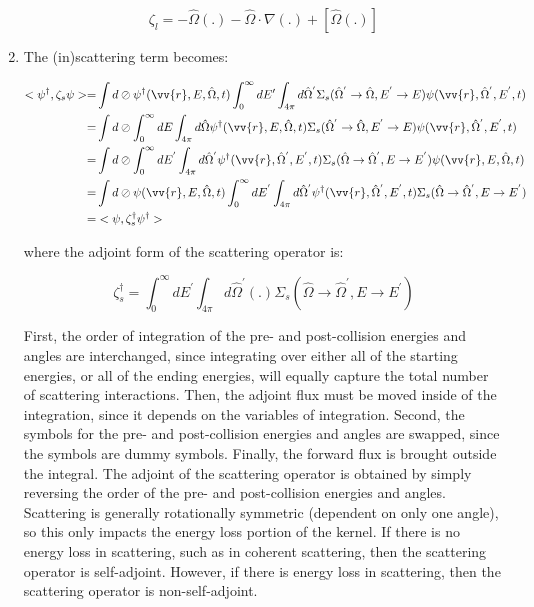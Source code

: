 \documentclass[10pt]{article}
\newcommand{\hO}{\hat{\Omega}}
\newcommand{\spa}{(\vv{r}, E, \hO, t)}
\begin{document}
\begin{flushleft}
\begin{enumerate}
\begin{equation}
\zeta_l=-\hO  (.)-\hO  \cdot\nabla(.)+\left\lbrack\hO  (.)\right\rbrack
\end{equation}

\item The (in)scattering term becomes:

\begin{equation}
\begin{aligned}
<\psi^\dagger,\zeta_s\psi>=& \int d\oslash\psi^\dagger\spa \int_0^\infty dE'\int_{4\pi}d\hO  ^{'}\Sigma_s(\hO  ^{'}\rightarrow\hO  , E^{'}\rightarrow E)\psi(\vv{r},\hO  ^{'},E^{'},t)\\
=& \int d\oslash\int_0^\infty dE\int_{4\pi}d\hO  \psi^\dagger\spa \Sigma_s(\hO  ^{'}\rightarrow\hO  , E^{'}\rightarrow E)\psi(\vv{r},\hO  ^{'},E^{'},t)\\
=& \int d\oslash\int_0^\infty dE^{'}\int_{4\pi}d\hO  ^{'}\psi^\dagger(\vv{r},\hO  ^{'},E^{'},t)\Sigma_s(\hO  \rightarrow\hO  ^{'}, E\rightarrow E^{'})\psi\spa \\
=& \int d\oslash\psi\spa \int_0^\infty dE^{'}\int_{4\pi}d\hO  ^{'}\psi^\dagger(\vv{r},\hO  ^{'},E^{'},t)\Sigma_s(\hO  \rightarrow\hO  ^{'}, E\rightarrow E^{'})\\
=& <\psi, \zeta_s^\dagger\psi^\dagger>
\end{aligned}
\end{equation}

where the adjoint form of the scattering operator is:

\begin{equation}
\zeta_s^\dagger= \int_0^\infty dE^{'}\int_{4\pi}d\hO  ^{'}(.)\Sigma_s(\hO  \rightarrow\hO  ^{'}, E\rightarrow E^{'})
\end{equation}

First, the order of integration of the pre- and post-collision energies and angles are interchanged, since integrating over either all of the starting energies, or all of the ending energies, will equally capture the total number of scattering interactions. Then, the adjoint flux must be moved inside of the integration, since it depends on the variables of integration. Second, the symbols for the pre- and post-collision energies and angles are swapped, since the symbols are dummy symbols. Finally, the forward flux is brought outside the integral. The adjoint of the scattering operator is obtained by simply reversing the order of the pre- and post-collision energies and angles. Scattering is generally rotationally symmetric (dependent on only one angle), so this only impacts the energy loss portion of the kernel. If there is no energy loss in scattering, such as in coherent scattering, then the scattering operator is self-adjoint. However, if there is energy loss in scattering, then the scattering operator is non-self-adjoint.


\end{enumerate}
\end{flushleft}
\end{document}
